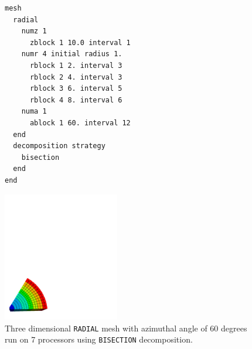 \begin{figure}[htbp]
\centering
  \begin{minipage}[c]{0.4\linewidth}
    \centering
{\ttfamily \begin{verbatim}
mesh
  radial
    numz 1
      zblock 1 10.0 interval 1
    numr 4 initial radius 1.
      rblock 1 2. interval 3
      rblock 2 4. interval 3
      rblock 3 6. interval 5
      rblock 4 8. interval 6
    numa 1
      ablock 1 60. interval 12
  end
  decomposition strategy
    bisection
  end
end
\end{verbatim}}
  \end{minipage}%
  \hfil
  \begin{minipage}[c]{0.6\linewidth}
    \centering
      \includegraphics[width=2.0in]{bisect_7_white}
  \end{minipage}
  \caption [\texttt{BISECTION} decomposition run on 7 processors.] {Three dimensional \texttt{RADIAL} mesh with azimuthal
    angle of 60 degrees run on 7 processors using \texttt{BISECTION} decomposition.}
  \label{fig:dec_bis}
\end{figure}


